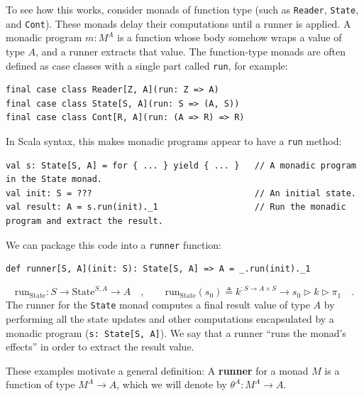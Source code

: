 To see how this works, consider monads of function type (such as \lstinline!Reader!,
\lstinline!State!, and \lstinline!Cont!). These monads delay their
computations until a runner is applied. A monadic program $m:M^{A}$
is a function whose body somehow wraps a value of type $A$, and a
runner extracts that value. The function-type monads are often defined
as case classes with a single part called \lstinline!run!, for example:
\begin{lstlisting}
final case class Reader[Z, A](run: Z => A)
final case class State[S, A](run: S => (A, S))
final case class Cont[R, A](run: (A => R) => R)
\end{lstlisting}
In Scala syntax, this makes monadic programs appear to have a \lstinline!run!
method:
\begin{lstlisting}
val s: State[S, A] = for { ... } yield { ... }   // A monadic program in the State monad.
val init: S = ???                                // An initial state.
val result: A = s.run(init)._1                   // Run the monadic program and extract the result.
\end{lstlisting}
We can package this code into a \lstinline!runner! function:
\begin{lstlisting}
def runner[S, A](init: S): State[S, A] => A = _.run(init)._1
\end{lstlisting}
\begin{equation}
\text{run}_{\text{State}}:S\rightarrow\text{State}^{S,A}\rightarrow A\quad,\quad\quad\text{run}_{\text{State}}(s_{0})\triangleq k^{:S\rightarrow A\times S}\rightarrow s_{0}\triangleright k\triangleright\pi_{1}\quad.\label{eq:definition-of-runState}
\end{equation}
The runner for the \lstinline!State! monad computes a final result
value of type $A$ by performing all the state updates and other computations
encapsulated by a monadic program (\lstinline!s: State[S, A]!). We
say that a runner \textsf{``}runs the monad\textsf{'}s effects\textsf{''} in order to extract
the result value.

These examples motivate a general definition: A \textbf{runner}
for a monad $M$ is a function of type $M^{A}\rightarrow A$, which
we will denote by $\theta^{A}:M^{A}\rightarrow A$.

